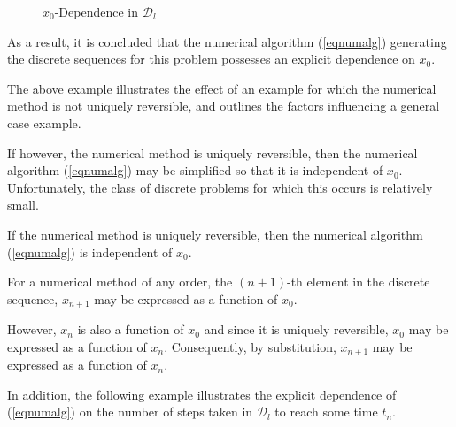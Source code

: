 \begin{eg}
\begin{figure}[h]
\begin{center}
 \caption{$x_0$-Dependence in $\mathcal{D}_l$}
\protect\label{pdisc6}
\end{center}
\end{figure}

As a result, it is concluded that the numerical algorithm (\ref{eqnumalg})
generating the discrete sequences for this problem possesses an
explicit dependence on $x_0$.
\end{eg}

The above example illustrates the effect of an example for which the numerical
method is not uniquely reversible, and outlines the factors influencing a
general case example.

If however, the numerical method is uniquely reversible,
then the numerical algorithm (\ref{eqnumalg}) may be simplified so that it is
independent of $x_0$. Unfortunately, the class of discrete problems for which
this occurs is relatively small.

\begin{lemma}
If the numerical method is uniquely reversible, then the numerical algorithm
(\ref{eqnumalg}) is independent of $x_0$.
\end{lemma}
\begin{prf}
For a numerical method of any order, the $(n+1)$-th element in the discrete
sequence, $x_{n+1}$ may be expressed as a function of $x_0$.

However, $x_n$ is also a function of $x_0$ and since it is uniquely reversible,
$x_0$ may be expressed as a function of $x_n$. Consequently, by substitution,
$x_{n+1}$ may be expressed as a function of $x_n$.
\end{prf}

In addition, the following example illustrates the explicit dependence of
(\ref{eqnumalg}) on the number of steps taken in $\mathcal{D}_l$ to reach some
time $t_n$.

